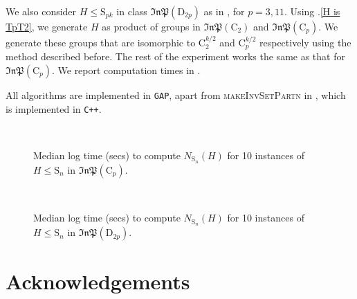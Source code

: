 \documentclass[11pt,a4paper]{article}
\theoremstyle{definition}
\theoremstyle{remark}
\newcommand{\InP}{\mathfrak{InP}}
\newcommand{\Sy}{\mathrm{S}}
\newcommand{\Cy}{\mathrm{C}}
\newcommand{\Di}{\mathrm{D}}
\begin{document}
We also consider $H \leq \Sy_{pk}$ in class $\InP(\Di_{2p})$ as in , for $p = 3,11$.
Using .\ref{H is TpT2}, we generate $H$ as product of groups in $\InP(\Cy_2)$ and $\InP(\Cy_{p})$. 
We generate these groups that are isomorphic to $\Cy_2^{k/2}$ and $\Cy_p^{k/2}$ respectively using the method described before. 
The rest of the experiment works the same as that for $\InP(\Cy_p)$.
We report computation times in . 


All algorithms are implemented in \texttt{GAP}, apart from \textsc{makeInvSetPartn} in , which is implemented in \texttt{C++}. 


\begin{figure}[htp!]
   \centering
   \quad
   \\
   \quad
   \caption{Median log time (secs) to compute $N_{\Sy_n}(H)$ for 10 instances of $H \leq \Sy_n$ in $\InP(\Cy_p)$. }
   \label{fig:Cpk}
\end{figure}
\begin{figure}[htp!]
   \centering
   \quad
    \\
   \caption{Median log time (secs) to compute $N_{\Sy_n}(H)$ for 10 instances of  $H \leq \Sy_n$ in $\InP(\Di_{2p})$.}
   \label{fig:dpk}
\end{figure}



\section*{Acknowledgements}
\end{document}
